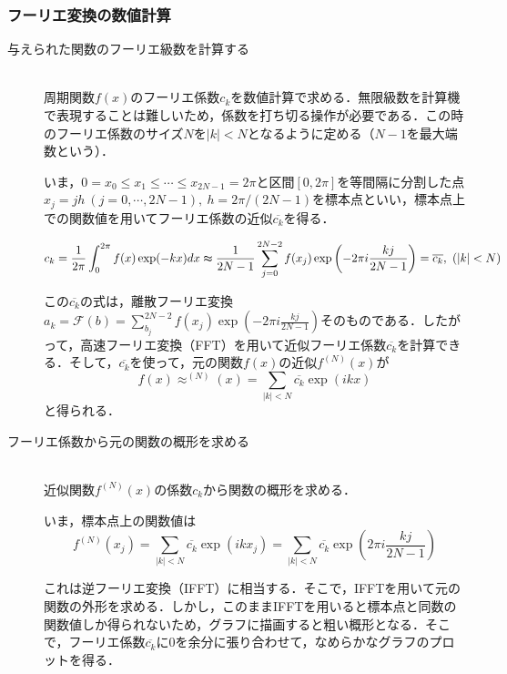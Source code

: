 \documentclass[11pt,a4paper]{jsarticle}
\theoremstyle{definition}
\begin{document}
\subsubsection{フーリエ変換の数値計算}
\begin{description}
  \item[与えられた関数のフーリエ級数を計算する]
    \quad\\
    周期関数$f(x)$のフーリエ係数$c_k$を数値計算で求める．無限級数を計算機で表現することは難しいため，係数を打ち切る操作が必要である．この時のフーリエ係数のサイズ$N$を$|k|<N$となるように定める（$N-1$を最大端数という）．

    いま，$0=x_0\leq x_1 \leq \cdots \leq x_{2N-1}=2\pi$と区間$[0,2\pi]$を等間隔に分割した点$x_j=jh\ (j=0,\cdots,2N-1),\ h=2\pi / (2N-1)$を標本点といい，標本点上での関数値を用いてフーリエ係数の近似$\overline{c_k}$を得る．

    \begin{equation*}
      c_k = \frac{1}{2\pi} \int_{0}^{2\pi} f(x) \exp(-kx) dx \thickapprox \frac{1}{2N-1} \sum_{j=0}^{2N-2} f(x_j) \exp\left(-2\pi i \frac{kj}{2N-1}\right) = \overline{c_k},\ (|k|<N)
    \end{equation*}

    この$\overline{c_k}$の式は，離散フーリエ変換$a_k=\mathcal{F}(b)=\sum_{b_j}^{2N-2} f(x_j) \exp\left(-2\pi i \frac{kj}{2N-1}\right)$そのものである．したがって，高速フーリエ変換（FFT）を用いて近似フーリエ係数$\overline{c_k}$を計算できる．そして，$\overline{c_k}$を使って，元の関数$f(x)$の近似$f^{(N)}(x)$が
    \begin{equation*}
      f(x) \approx ^{(N)}(x) = \sum_{|k|<N} \overline{c_k} \exp(ikx)
    \end{equation*}
    と得られる．

  \item[フーリエ係数から元の関数の概形を求める]
    \quad\\
    近似関数$f^{(N)}(x)$の係数$c_k$から関数の概形を求める．

    いま，標本点上の関数値は
    \begin{equation*}
      f^{(N)}(x_j) = \sum_{|k|<N} \overline{c_k} \exp(ikx_j) = \sum_{|k|<N} \overline{c_k} \exp\left(2\pi i \frac{kj}{2N-1}\right)
    \end{equation*}

    これは逆フーリエ変換（IFFT）に相当する．そこで，IFFTを用いて元の関数の外形を求める．しかし，このままIFFTを用いると標本点と同数の関数値しか得られないため，グラフに描画すると粗い概形となる．そこで，フーリエ係数$\overline{c_k}$に0を余分に張り合わせて，なめらかなグラフのプロットを得る．



\end{description}
\end{document}
